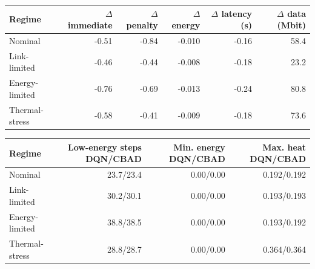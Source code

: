 \begin{tabular}{lrrrrr}
\toprule
Regime & $\Delta$ immediate & $\Delta$ penalty & $\Delta$ energy & $\Delta$ latency (s) & $\Delta$ data (Mbit) \\
\midrule
Nominal & -0.51 & -0.84 & -0.010 & -0.16 & 58.4 \\
Link-limited & -0.46 & -0.44 & -0.008 & -0.18 & 23.2 \\
Energy-limited & -0.76 & -0.69 & -0.013 & -0.24 & 80.8 \\
Thermal-stress & -0.58 & -0.41 & -0.009 & -0.18 & 73.6 \\
\bottomrule
\end{tabular}
\par\medskip
\begin{tabular}{lrrr}
\toprule
Regime & Low-energy steps DQN/CBAD & Min. energy DQN/CBAD & Max. heat DQN/CBAD \\
\midrule
Nominal & 23.7/23.4 & 0.00/0.00 & 0.192/0.192 \\
Link-limited & 30.2/30.1 & 0.00/0.00 & 0.193/0.193 \\
Energy-limited & 38.8/38.5 & 0.00/0.00 & 0.193/0.192 \\
Thermal-stress & 28.8/28.7 & 0.00/0.00 & 0.364/0.364 \\
\bottomrule
\end{tabular}